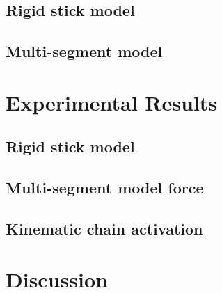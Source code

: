 \documentclass[twocolumn]{aastex631}
\begin{document}
\subsection{Rigid stick model}


\subsection{Multi-segment model}


\section{Experimental Results}
\label{sec:results}

\subsection{Rigid stick model}

\subsection{Multi-segment model force}

\subsection{Kinematic chain activation}

\section{Discussion}
\label{sec:discussion}





\end{document}
